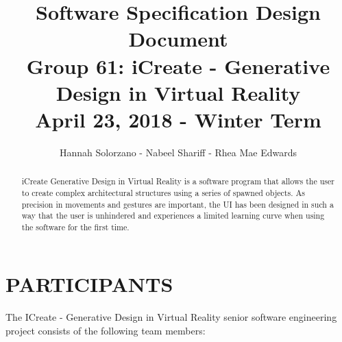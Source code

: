 \documentclass[draftclsnofoot,onecolumn,compsoc]{IEEEtran}
\begin{document}
\vfill


\begin{titlepage}

\title{
  ~ \\ ~ \\ ~ \\ ~ \\ ~ \\
  Software Specification Design Document \\ \bigskip
  \large
  Group 61: iCreate - Generative Design in Virtual Reality \\
  April 23, 2018 - Winter Term}
    
\end{titlepage}

\author{Hannah Solorzano - Nabeel Shariff - Rhea Mae Edwards}

\maketitle


\vfill


\begin{abstract}
\par \noindent
iCreate Generative Design in Virtual Reality is a software program that allows the user to create complex architectural structures using a series of spawned objects. As precision in movements and gestures are important, the UI has been designed in such a way that the user is unhindered and experiences a limited learning curve when using the software for the first time.
\end{abstract}

\newpage


\section*{PARTICIPANTS}
The ICreate - Generative Design in Virtual Reality senior software engineering project consists of the following team members:
\bigskip
\end{document}
